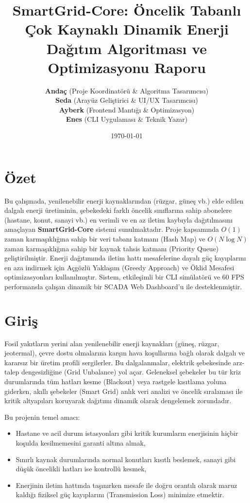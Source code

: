 \documentclass[12pt,a4paper]{article}
\title{\textbf{SmartGrid-Core: Öncelik Tabanlı Çok Kaynaklı Dinamik Enerji Dağıtım Algoritması ve Optimizasyonu Raporu}}
\author{
  \textbf{Andaç} (Proje Koordinatörü \& Algoritma Tasarımcısı) \\
  \textbf{Seda} (Arayüz Geliştirici \& UI/UX Tasarımcısı) \\
  \textbf{Ayberk} (Frontend Mantığı \& Optimizasyon) \\
  \textbf{Enes} (CLI Uygulaması \& Teknik Yazar)
}
\date{\today}
\begin{document}
\maketitle
\newpage

\tableofcontents
\newpage

\section{Özet}
Bu çalışmada, yenilenebilir enerji kaynaklarından (rüzgar, güneş vb.) elde edilen dalgalı enerji üretiminin, şebekedeki farklı öncelik sınıflarına sahip abonelere (hastane, konut, sanayi vb.) en verimli ve en az iletim kaybıyla dağıtılmasını amaçlayan \textbf{SmartGrid-Core} sistemi sunulmaktadır. Proje kapsamında $O(1)$ zaman karmaşıklığına sahip bir veri tabanı katmanı (Hash Map) ve $O(N \log N)$ zaman karmaşıklığına sahip bir kaynak tahsis katmanı (Priority Queue) geliştirilmiştir. Enerji dağıtımında iletim hattı mesafelerine dayalı güç kayıplarını en aza indirmek için Açgözlü Yaklaşım (Greedy Approach) ve Öklid Mesafesi optimizasyonları kullanılmıştır. Sistem, etkileşimli bir CLI simülatörü ve 60 FPS performansla çalışan dinamik bir SCADA Web Dashboard'u ile desteklenmiştir.

\section{Giriş}
Fosil yakıtların yerini alan yenilenebilir enerji kaynakları (güneş, rüzgar, jeotermal), çevre dostu olmalarına karşın hava koşullarına bağlı olarak dalgalı ve kararsız bir üretim profili sergilerler. Bu dalgalanmalar, elektrik şebekesinde arz-talep dengesizliğine (Grid Unbalance) yol açar. Geleneksel şebekeler bu tür kriz durumlarında tüm hatları kesme (Blackout) veya rastgele kısıtlama yoluna giderken, akıllı şebekeler (Smart Grid) anlık veri analizi ve öncelik sıralaması ile kritik altyapıları koruyarak dağıtımı dinamik olarak dengelemek zorundadır.

Bu projenin temel amacı:
\begin{itemize}
    \item Hastane ve acil durum istasyonları gibi kritik kurumların enerjisinin hiçbir koşulda kesilmemesini garanti altına almak,
    \item Sınırlı kaynak durumlarında normal konutları kısıtlı beslemek, sanayi gibi düşük öncelikli hatları ise kontrollü kesmek,
    \item Enerjinin iletim hattında taşınırken mesafe ile doğru orantılı olarak maruz kaldığı fiziksel güç kayıplarını (Transmission Loss) minimize etmektir.
\end{itemize}
\end{document}
